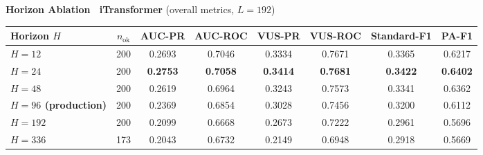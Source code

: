 \documentclass[border=2pt,varwidth=\maxdimen]{standalone}
\begin{document}
\begin{center}
\textbf{\large Horizon Ablation \textemdash\ iTransformer} \quad (overall metrics, $L=192$)\par\vspace{6pt}
\renewcommand{\arraystretch}{1.1}
\setlength{\tabcolsep}{6pt}
\small

\begin{tabular}{l|c|cccccc}
\toprule
\textbf{Horizon $H$} & \textbf{$n_\textrm{ok}$} & \textbf{AUC-PR} & \textbf{AUC-ROC} & \textbf{VUS-PR} & \textbf{VUS-ROC} & \textbf{Standard-F1} & \textbf{PA-F1} \\
\midrule
\textbf{$H=12$}  & 200 & 0.2693 & 0.7046 & 0.3334 & 0.7671 & 0.3365 & 0.6217 \\
\textbf{$H=24$}  & 200 & \textbf{0.2753} & \textbf{0.7058} & \textbf{0.3414} & \textbf{0.7681} & \textbf{0.3422} & \textbf{0.6402} \\
\textbf{$H=48$}  & 200 & 0.2619 & 0.6964 & 0.3243 & 0.7573 & 0.3341 & 0.6362 \\
\textbf{$H=96$ (production)}  & 200 & 0.2369 & 0.6854 & 0.3028 & 0.7456 & 0.3200 & 0.6112 \\
\textbf{$H=192$}  & 200 & 0.2099 & 0.6668 & 0.2673 & 0.7222 & 0.2961 & 0.5696 \\
\textbf{$H=336$}  & 173 & 0.2043 & 0.6732 & 0.2149 & 0.6948 & 0.2918 & 0.5669 \\
\bottomrule
\end{tabular}
\end{center}
\end{document}
